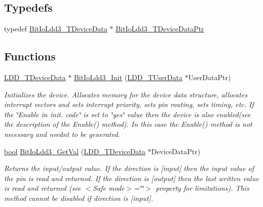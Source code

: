 \subsection*{Typedefs}
\begin{DoxyCompactItemize}
\item 
typedef \hyperlink{struct_bit_io_ldd3___t_device_data}{Bit\+Io\+Ldd3\+\_\+\+T\+Device\+Data} $\ast$ \hyperlink{group___bit_io_ldd3__module_gaa162b471b4dc4d029c586b9fd25eb188}{Bit\+Io\+Ldd3\+\_\+\+T\+Device\+Data\+Ptr}
\end{DoxyCompactItemize}
\subsection*{Functions}
\begin{DoxyCompactItemize}
\item 
\hyperlink{group___p_e___types__module_gac5cf1362f1f0e3a2ce71b1bf2276d091}{L\+D\+D\+\_\+\+T\+Device\+Data} $\ast$ \hyperlink{group___bit_io_ldd3__module_gaf15a33397436187afce41eff9523414f}{Bit\+Io\+Ldd3\+\_\+\+Init} (\hyperlink{group___p_e___types__module_ga0b66a73f87238a782318aa0be7578e35}{L\+D\+D\+\_\+\+T\+User\+Data} $\ast$User\+Data\+Ptr)
\begin{DoxyCompactList}\small\item\em Initializes the device. Allocates memory for the device data structure, allocates interrupt vectors and sets interrupt priority, sets pin routing, sets timing, etc. If the \char`\"{}\+Enable
    in init. code\char`\"{} is set to \char`\"{}yes\char`\"{} value then the device is also enabled(see the description of the Enable() method). In this case the Enable() method is not necessary and needn\textquotesingle{}t to be generated. \end{DoxyCompactList}\item 
\hyperlink{group___p_e___types__module_ga97a80ca1602ebf2303258971a2c938e2}{bool} \hyperlink{group___bit_io_ldd3__module_gaf69704b3907d4685c381341b67daf0f2}{Bit\+Io\+Ldd3\+\_\+\+Get\+Val} (\hyperlink{group___p_e___types__module_gac5cf1362f1f0e3a2ce71b1bf2276d091}{L\+D\+D\+\_\+\+T\+Device\+Data} $\ast$Device\+Data\+Ptr)
\begin{DoxyCompactList}\small\item\em Returns the input/output value. If the direction is \mbox{[}input\mbox{]} then the input value of the pin is read and returned. If the direction is \mbox{[}output\mbox{]} then the last written value is read and returned (see $<$\+Safe mode$>$=\char`\"{}\char`\"{}$>$ property for limitations). This method cannot be disabled if direction is \mbox{[}input\mbox{]}. \end{DoxyCompactList}\item 

\end{DoxyCompactItemize}
